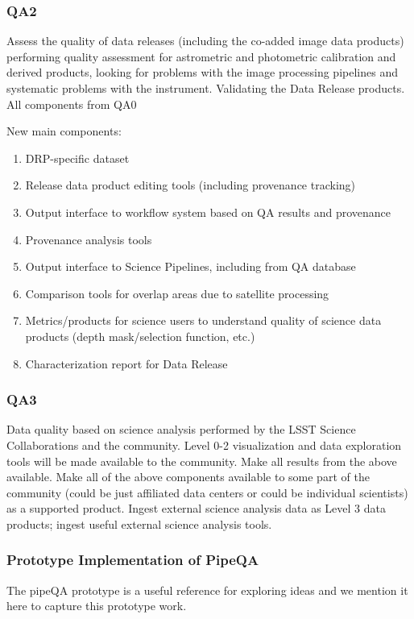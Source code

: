 \subsubsection{QA2}
Assess the quality of data releases (including the co-added image data products) performing quality assessment for astrometric and photometric calibration and derived products, looking for problems with the image processing pipelines and systematic problems with the instrument.
Validating the Data Release products.
All components from QA0

New main components:
\begin{enumerate}
\item DRP-specific dataset
\item Release data product editing tools (including provenance tracking)
\item Output interface to workflow system based on QA results and provenance
\item Provenance analysis tools
\item Output interface to Science Pipelines, including from QA database
\item Comparison tools for overlap areas due to satellite processing 
\item Metrics/products for science users to understand quality of science data products (depth mask/selection function, etc.)
\item Characterization report for Data Release
\end{enumerate}

\subsubsection{QA3}
Data quality based on science analysis performed by the LSST Science Collaborations and the community. Level 0-2 visualization and data exploration tools will be made available to the community.
Make all results from the above available. Make all of the above components available to some part of the community (could be just affiliated data centers or could be individual scientists) as a supported product.
Ingest external science analysis data as Level 3 data products; ingest useful external science analysis tools.

\subsubsection{Prototype Implementation of PipeQA}

The pipeQA prototype is a useful reference for exploring ideas and we mention
it here to capture this prototype work.

